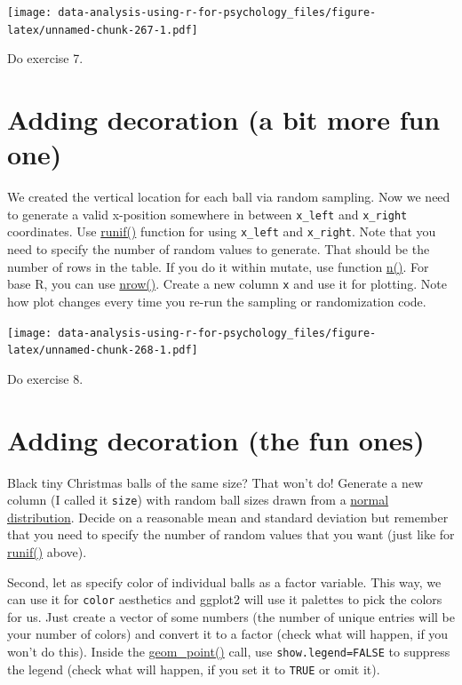 \documentclass[
]{book}
\begin{document}
\texttt{[image: data-analysis-using-r-for-psychology\_files/figure-latex/unnamed-chunk-267-1.pdf]}

Do exercise 7.

\hypertarget{adding-decoration-a-bit-more-fun-one}{%
\section{Adding decoration (a bit more fun one)}\label{adding-decoration-a-bit-more-fun-one}}

We created the vertical location for each ball via random sampling. Now we need to generate a valid x-position somewhere in between \texttt{x\_left} and \texttt{x\_right} coordinates. Use \href{https://stat.ethz.ch/R-manual/R-devel/library/stats/html/Uniform.html}{runif()} function for using \texttt{x\_left} and \texttt{x\_right}. Note that you need to specify the number of random values to generate. That should be the number of rows in the table. If you do it within mutate, use function \href{https://dplyr.tidyverse.org/reference/context.html}{n()}. For base R, you can use \href{https://stat.ethz.ch/R-manual/R-devel/library/base/html/nrow.html}{nrow()}. Create a new column \texttt{x} and use it for plotting. Note how plot changes every time you re-run the sampling or randomization code.

\texttt{[image: data-analysis-using-r-for-psychology\_files/figure-latex/unnamed-chunk-268-1.pdf]}

Do exercise 8.

\hypertarget{adding-decoration-the-fun-ones}{%
\section{Adding decoration (the fun ones)}\label{adding-decoration-the-fun-ones}}

Black tiny Christmas balls of the same size? That won't do! Generate a new column (I called it \texttt{size}) with random ball sizes drawn from a \href{https://stat.ethz.ch/R-manual/R-devel/library/stats/html/Normal.html}{normal distribution}. Decide on a reasonable mean and standard deviation but remember that you need to specify the number of random values that you want (just like for \href{https://stat.ethz.ch/R-manual/R-devel/library/stats/html/Uniform.html}{runif()} above).

Second, let as specify color of individual balls as a factor variable. This way, we can use it for \texttt{color} aesthetics and ggplot2 will use it palettes to pick the colors for us. Just create a vector of some numbers (the number of unique entries will be your number of colors) and convert it to a factor (check what will happen, if you won't do this). Inside the \href{https://ggplot2.tidyverse.org/reference/geom_point.html}{geom\_point()} call, use \texttt{show.legend=FALSE} to suppress the legend (check what will happen, if you set it to \texttt{TRUE} or omit it).
\end{document}
